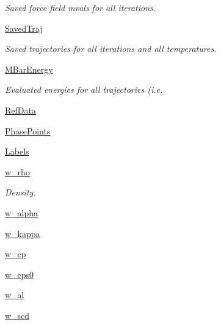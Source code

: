 \begin{DoxyCompactItemize}
\begin{DoxyCompactList}\small\item\em Saved force field mvals for all iterations. \end{DoxyCompactList}\item 
\hyperlink{classforcebalance_1_1lipid_1_1Lipid_a49bef67b40e46c5df608c00d2519b111}{Saved\-Traj}
\begin{DoxyCompactList}\small\item\em Saved trajectories for all iterations and all temperatures. \end{DoxyCompactList}\item 
\hyperlink{classforcebalance_1_1lipid_1_1Lipid_aa41ccbc13f7ca3f0700b825a9e51a24a}{M\-Bar\-Energy}
\begin{DoxyCompactList}\small\item\em Evaluated energies for all trajectories (i.\-e. \end{DoxyCompactList}\item 
\hyperlink{classforcebalance_1_1lipid_1_1Lipid_a68d0649454816e6f1eb121166ccc9e00}{Ref\-Data}
\item 
\hyperlink{classforcebalance_1_1lipid_1_1Lipid_a06402bf1c90229f6a585c7b97490a358}{Phase\-Points}
\item 
\hyperlink{classforcebalance_1_1lipid_1_1Lipid_a11762b444ea898e606b4fa1443f2340b}{Labels}
\item 
\hyperlink{classforcebalance_1_1lipid_1_1Lipid_aeda7b6f1accd80386a1a50fdb90ff318}{w\-\_\-rho}
\begin{DoxyCompactList}\small\item\em Density. \end{DoxyCompactList}\item 
\hyperlink{classforcebalance_1_1lipid_1_1Lipid_ad945268a85a7e15086ceb5b3046a6f21}{w\-\_\-alpha}
\item 
\hyperlink{classforcebalance_1_1lipid_1_1Lipid_a3d7a1134b742778f6d5e4023b4d4a414}{w\-\_\-kappa}
\item 
\hyperlink{classforcebalance_1_1lipid_1_1Lipid_a5165cf9a6a12094842ff5f5962d725c2}{w\-\_\-cp}
\item 
\hyperlink{classforcebalance_1_1lipid_1_1Lipid_adf9666004923aa1672770b94d7cc8038}{w\-\_\-eps0}
\item 
\hyperlink{classforcebalance_1_1lipid_1_1Lipid_a204f491eb38e8a8570c74d7eaf3d940a}{w\-\_\-al}
\item 
\hyperlink{classforcebalance_1_1lipid_1_1Lipid_a6f9b743f37d3e891a9815b6bc1e1e475}{w\-\_\-scd}
\item 

\end{DoxyCompactItemize}
